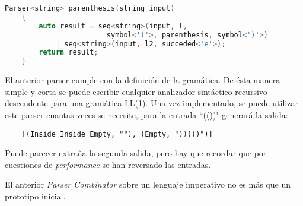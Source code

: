 	\begin{lstlisting}[language=C++, caption=Utilización de los Parser combinators en C++]
	Parser<string> parenthesis(string input)
	{
		auto result = seq<string>(input, l, 
						symbol<'('>, parenthesis, symbol<')'>) 
			| seq<string>(input, l2, succeded<'e'>);
		return result;
	}		
	\end{lstlisting}
	
	El anterior parser cumple con la definición de la gramática. De ésta manera simple y corta se puede escribir cualquier analizador sintáctico recursivo descendente para una gramática LL(1).
	\newpage
	Una vez implementado, se puede utilizar este parser cuantas veces se necesite, para la entrada ``(())" generará la salida:
	\begin{lstlisting}
	[(Inside Inside Empty, ""), (Empty, "))(()")]	
	\end{lstlisting}
	
	Puede parecer extraña la segunda salida, pero hay que recordar que por cuestiones de \emph{performance} se han reversado las entradas.
	
El anterior \emph{Parser Combinator} sobre un lenguaje imperativo no es más que un prototipo inicial.




